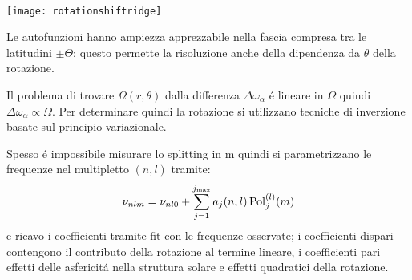 \documentclass[../main.tex]{subfiles}
\begin{document}
\thispagestyle{plain}

\begin{center}

\begin{minipage}{0.3\textwidth}
\label{fig:rotationshiftridge}
\end{minipage}
~
\begin{minipage}{0.3\textwidth}
\texttt{[image: rotationshiftridge]}
\end{minipage}

\end{center}

Le autofunzioni hanno ampiezza apprezzabile nella fascia compresa tra le latitudini $\pm\Theta$: questo permette la risoluzione anche della dipendenza da $\theta$ della rotazione.

Il problema di trovare $\Omega(r,\theta)$ dalla differenza $\Delta\omega_{\alpha}$ \'e lineare in $\Omega$ quindi $\Delta\omega_{\alpha}\propto\Omega$. Per determinare quindi la rotazione si utilizzano tecniche di inverzione basate sul principio variazionale.


Spesso \'e impossibile misurare lo splitting in m quindi si parametrizzano le frequenze nel multipletto $(n,l)$ tramite:
\begin{equation}
\nu_{nlm}=\nu_{nl0}+\sum_{j=1}^{j_{\max}}a_j(n,l)\operatorname{Pol}_j^{(l)}(m)\label{eq:freqmulti}
\end{equation}
e ricavo i coefficienti tramite fit con le frequenze osservate; i coefficienti dispari contengono il contributo della rotazione al termine lineare, i coefficienti pari effetti delle asfericit\'a nella struttura solare e effetti quadratici della rotazione.
\end{document}
